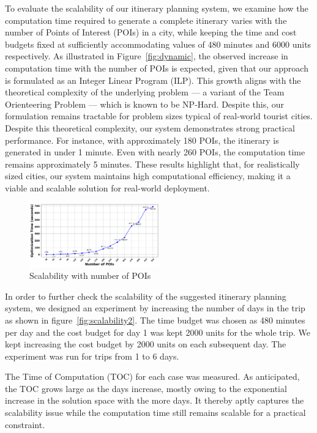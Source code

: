 To evaluate the scalability of our itinerary planning system, we examine how the computation time required to generate a complete itinerary varies with the number of Points of Interest (POIs) in a city, while keeping the time and cost budgets fixed at sufficiently accommodating values of 480 minutes and 6000 units respectively. As illustrated in Figure~\ref{fig:dynamic}, the observed increase in computation time with the number of POIs is expected, given that our approach is formulated as an Integer Linear Program (ILP). This growth aligns with the theoretical complexity of the underlying problem — a variant of the Team Orienteering Problem — which is known to be NP-Hard. Despite this, our formulation remains tractable for problem sizes typical of real-world tourist cities. Despite this theoretical complexity, our system demonstrates strong practical performance. For instance, with approximately 180 POIs, the itinerary is generated in under 1 minute. Even with nearly 260 POIs, the computation time remains approximately 5 minutes. These results highlight that, for realistically sized cities, our system maintains high computational efficiency, making it a viable and scalable solution for real-world deployment.

\begin{figure}[t]
    \centering
    \includegraphics[width=0.50\textwidth]{plots/scalability_new_pkj.png}
    \caption{Scalability with number of POIs}
    \label{fig:number-of-pois}
\end{figure}

In order to further check the scalability of the suggested itinerary planning system, we designed an experiment by increasing the number of days in the trip as shown in figure~\ref{fig:scalability2}. The time budget was chosen as 480 minutes per day and the cost budget for day 1 was kept 2000 units for the whole trip. We kept increasing the cost budget by 2000 units on each subsequent day. The experiment was run for trips from 1 to 6 days.

The Time of Computation (TOC) for each case was measured. As anticipated, the TOC grows large as the days increase, mostly owing to the exponential increase in the solution space with the more days. It thereby aptly captures the scalability issue while the computation time still remains scalable for a practical constraint.\\

